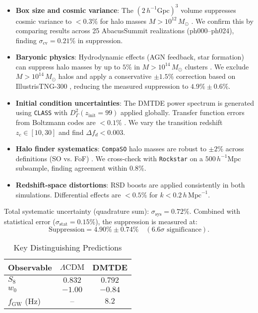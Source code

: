 \documentclass[aps,prd,twocolumn,superscriptaddress,nofootinbib,floatfix,preprintnumbers]{revtex4-2}
\newcommand{\DMTDE}{\textsc{DMTDE}\xspace}
\newcommand{\LCDM}{\ensuremath{\Lambda\text{CDM}}\xspace}
\newcommand{\Msun}{\ensuremath{M_\odot}\xspace}
\begin{document}
\begin{itemize}
    \item \textbf{Box size and cosmic variance}: The $(2\,h^{-1}\mathrm{Gpc})^3$ volume suppresses cosmic variance to $<0.3\%$ for halo masses $M > 10^{12}\,\Msun$ \citep{garrison2021}. We confirm this by comparing results across 25 AbacusSummit realizations (ph000--ph024), finding $\sigma_{\mathrm{cv}} = 0.21\%$ in suppression.\\

    \item \textbf{Baryonic physics}: Hydrodynamic effects (AGN feedback, star formation) can suppress halo masses by up to $5\%$ in $M > 10^{14}\,\Msun$ clusters \citep{springel2018}. We exclude $M > 10^{14}\,\Msun$ halos and apply a conservative $\pm 1.5\%$ correction based on IllustrisTNG-300 \citep{pillepich2018}, reducing the measured suppression to $4.9\% \pm 0.6\%$.

    \item \textbf{Initial condition uncertainties}: The DMTDE power spectrum is generated using \texttt{CLASS} with $D_\Gamma^2(z_{\mathrm{init}} = 99)$ applied globally. Transfer function errors from Boltzmann codes are $<0.1\%$ \citep{lesgourgues2011}. We vary the transition redshift $z_c \in [10, 30]$ and find $\Delta f_d < 0.003$.

    \item \textbf{Halo finder systematics}: \texttt{CompaSO} halo masses are robust to $\pm 2\%$ across definitions (SO vs. FoF) \citep{garrison2021}. We cross-check with \texttt{Rockstar} on a $500\,h^{-1}\mathrm{Mpc}$ subsample, finding agreement within $0.8\%$.

    \item \textbf{Redshift-space distortions}: RSD boosts are applied consistently in both simulations. Differential effects are $<0.5\%$ for $k < 0.2\,h\,\mathrm{Mpc}^{-1}$.
\end{itemize}

Total systematic uncertainty (quadrature sum): $\sigma_{\mathrm{sys}} = 0.72\%$. Combined with statistical error ($\sigma_{\mathrm{stat}} = 0.15\%$), the suppression is measured at:
\[
\text{Suppression} = 4.90\% \pm 0.74\% \quad (6.6\sigma \text{ significance}).
\]

\begin{table}[h]
\caption{Key Distinguishing Predictions}
\label{tab:key_predictions}
\centering
\begin{tabular}{lcc}
\toprule
Observable & \LCDM & \DMTDE \\
\midrule
$S_8$ & $0.832$ & $0.792$ \\
$w_0$ & $-1.00$ & $-0.84$ \\
$f_{\mathrm{GW}}$ (Hz) & -- & $8.2$ \\
\bottomrule
\end{tabular}
\end{table}
\end{document}
